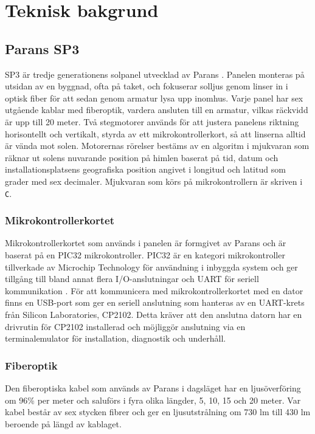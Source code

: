 \section{Teknisk bakgrund} %
\label{sec:teknisk_bakgrund}
    \subsection{Parans SP3} %
    \label{sub:parans_sp3}
        SP3 är tredje generationens solpanel utvecklad av Parans \cite{parans_manual}. Panelen monteras på utsidan av en byggnad, ofta på taket, och fokuserar solljus genom linser in i optisk fiber för att sedan genom armatur lysa upp inomhus. Varje panel har sex utgående kablar med fiberoptik, vardera ansluten till en armatur, vilkas räckvidd är upp till 20 meter. Två stegmotorer används för att justera panelens riktning horisontellt och vertikalt, styrda av ett mikrokontrollerkort, så att linserna alltid är vända mot solen. Motorernas rörelser bestäms av en algoritm i mjukvaran som räknar ut solens nuvarande position på himlen baserat på tid, datum och installationsplatsens geografiska position angivet i longitud och latitud som grader med sex decimaler. Mjukvaran som körs på mikrokontrollern är skriven i \texttt{C}.

        \subsubsection{Mikrokontrollerkortet} %
        \label{ssub:mikrokontrollerkortet}
            Mikrokontrollerkortet som används i panelen är formgivet av Parans och är baserat på en PIC32 mikrokontroller. PIC32 är en kategori mikrokontroller tillverkade av Microchip Technology för användning i inbyggda system och ger tillgång till bland annat flera I/O-anslutningar och UART för seriell kommunikation \cite[s.~42--44]{PIC32}. För att kommunicera med mikrokontrollerkortet med en dator finns en USB-port som ger en seriell anslutning som hanteras av en UART-krets från Silicon Laboratories, CP2102. Detta kräver att den anslutna datorn har en drivrutin för CP2102 installerad och möjliggör anslutning via en terminalemulator för installation, diagnostik och underhåll.

        \subsubsection{Fiberoptik} %
        \label{ssub:fiberoptik}
            Den fiberoptiska kabel som används av Parans i dagsläget har en ljusöverföring om 96\% per meter och saluförs i fyra olika längder, 5, 10, 15 och 20 meter. Var kabel består av sex stycken fibrer och ger en ljusutstrålning om 730 lm till 430 lm beroende på längd av kablaget.
        
